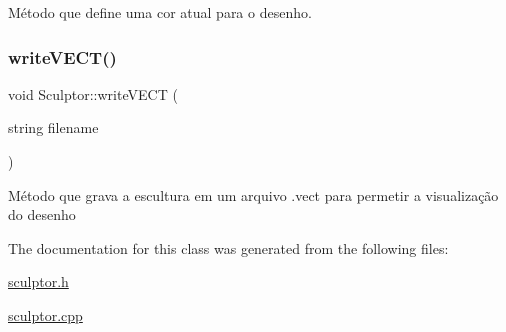 Método que define uma cor atual para o desenho. \mbox{\label{classSculptor_a200442de17ed45b7a1ece728145a2ddf}} 
\subsubsection{\texorpdfstring{writeVECT()}{writeVECT()}}
{\footnotesize\ttfamily void Sculptor\+::write\+V\+E\+CT (\begin{DoxyParamCaption}\item[{string}]{filename }\end{DoxyParamCaption})}

Método que grava a escultura em um arquivo .vect para permetir a visualização do desenho 

The documentation for this class was generated from the following files\+:\begin{DoxyCompactItemize}
\item 
\mbox{\hyperlink{sculptor_8h}{sculptor.\+h}}\item 
\mbox{\hyperlink{sculptor_8cpp}{sculptor.\+cpp}}\end{DoxyCompactItemize}
